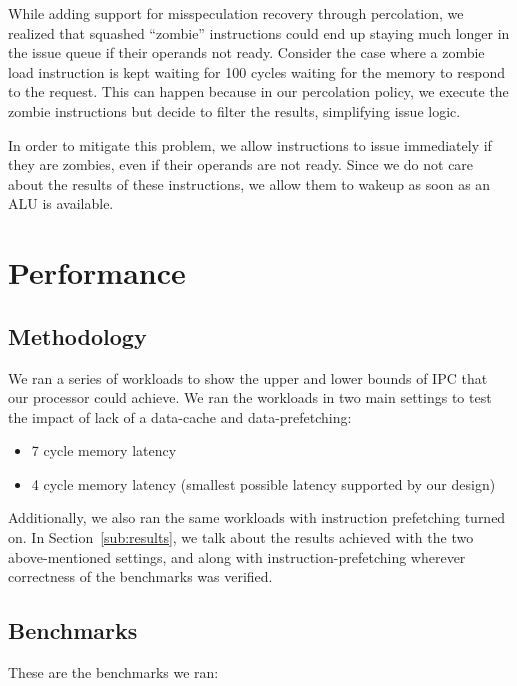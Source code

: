 \documentclass{article}
\begin{document}
While adding support for misspeculation recovery through percolation, we
realized that squashed ``zombie'' instructions could end up staying much longer
in the issue queue if their operands not ready.  Consider the case where a
zombie load instruction is kept waiting for 100 cycles waiting for the memory to
respond to the request. This can happen because in our percolation policy, we
execute the zombie instructions but decide to filter the results, simplifying
issue logic.

In order to mitigate this problem, we allow instructions to issue immediately if
they are zombies, even if their operands are not ready. Since we do not care
about the results of these instructions, we allow them to wakeup as soon as an
ALU is available.

\section{Performance}
\label{sec:performance}

\subsection{Methodology}
We ran a series of workloads to show the upper and lower bounds of IPC that our
processor could achieve. We ran the workloads in two main settings to test the
impact of lack of a data-cache and data-prefetching:
\begin{itemize}
\itemsep 0em
	\item 7 cycle memory latency
	\item 4 cycle memory latency (smallest possible latency supported by
	our design)
\end{itemize}

Additionally, we also ran the same workloads with instruction prefetching
turned on. In Section~\ref{sub:results}, we talk about the results achieved
with the two above-mentioned settings, and along with instruction-prefetching
wherever correctness of the benchmarks was verified.

\subsection{Benchmarks}
These are the benchmarks we ran:
\end{document}
